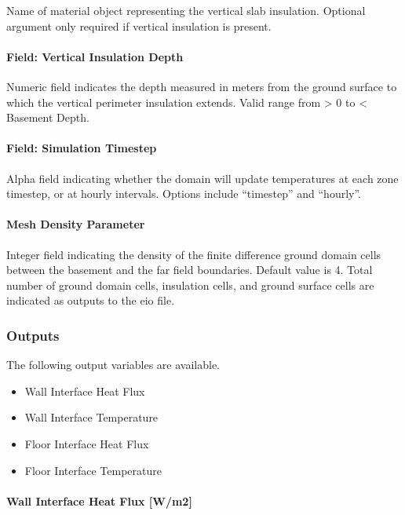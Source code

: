 Name of material object representing the vertical slab insulation. Optional argument only required if vertical insulation is present.

\paragraph{Field: Vertical Insulation Depth}\label{field-vertical-insulation-depth-1}

Numeric field indicates the depth measured in meters from the ground surface to which the vertical perimeter insulation extends. Valid range from \textgreater{} 0 to \textless{} Basement Depth.

\paragraph{Field: Simulation Timestep}\label{field-simulation-timestep-1}

Alpha field indicating whether the domain will update temperatures at each zone timestep, or at hourly intervals. Options include ``timestep'' and ``hourly''.

\paragraph{Mesh Density Parameter}\label{mesh-density-parameter}

Integer field indicating the density of the finite difference ground domain cells between the basement and the far field boundaries. Default value is 4. Total number of ground domain cells, insulation cells, and ground surface cells are indicated as outputs to the eio file.

\subsubsection{Outputs}\label{outputs-2-013}

The following output variables are available.

\begin{itemize}
\item
  Wall Interface Heat Flux
\item
  Wall Interface Temperature
\item
  Floor Interface Heat Flux
\item
  Floor Interface Temperature
\end{itemize}

\paragraph{Wall Interface Heat Flux {[}W/m2{]}}\label{wall-interface-heat-flux-wm2}

